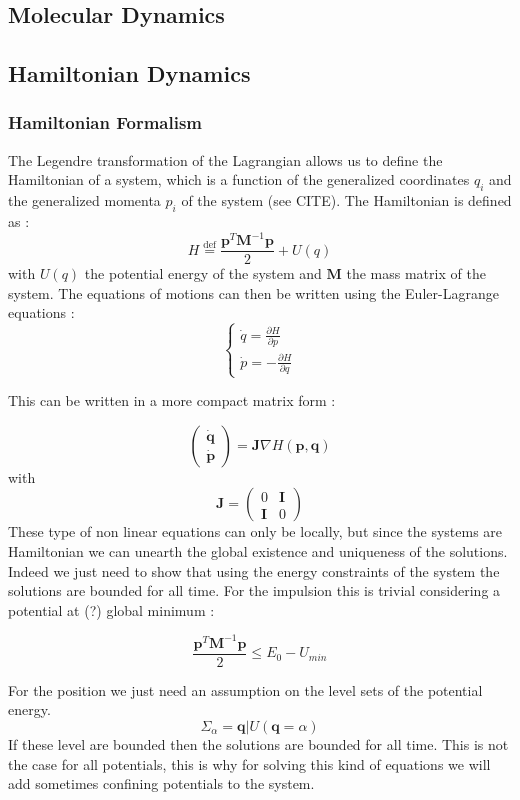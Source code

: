 \documentclass[ansiapaper]{report}
\newcommand*{\defeq}{\stackrel{\text{def}}{=}}
\begin{document}
\begin{multicols}{3}
  \chapter{Molecular Dynamics}
  \section{Hamiltonian Dynamics}
  \subsection{Hamiltonian Formalism}

  The Legendre transformation of the Lagrangian allows us to define the Hamiltonian of a system, which is a function of the generalized coordinates $q_i$ and the generalized momenta $p_i$ of the system (see CITE). The Hamiltonian is defined as :
  $$ H \defeq \frac{\textbf{p} ^T \textbf{M} ^{-1} \textbf{p}  }{2} + U(q)$$
  with $U(q)$ the potential energy of the system and $\textbf{M}$ the mass matrix of the system. The equations of motions can then be written using the Euler-Lagrange equations :
  $$
    \begin{cases}
      \dot{q} = \frac{\partial H}{\partial p} \\
      \dot{p} = -\frac{\partial H}{\partial q}
    \end{cases}
  $$

  This can be written in a more compact matrix form :

  $$ \begin{pmatrix}
      \dot{\textbf{q} } \\
      \dot{\textbf{p} }
    \end{pmatrix} = \textbf{J} \nabla H(\textbf{p} ,\textbf{q} )
  $$
  with $$\textbf{J} = \begin{pmatrix}
      0          & \textbf{I} \\
      \textbf{I} & 0
    \end{pmatrix} $$
  These type of non linear equations can only be locally, but since the systems are Hamiltonian we can unearth the global existence and uniqueness of the solutions. Indeed we just need to show that using the energy constraints of the system the solutions are bounded for all time. For the impulsion this is trivial considering a potential at (?) global minimum :

  $$ \frac{\textbf{p}^T \textbf{M} ^{-1} \textbf{p} }{2} \leq E_0 - U_{min}$$

  For the position we just need an assumption on the level sets of the potential energy. $$ \Sigma_{\alpha} = {\textbf{q}|U(\textbf{q} = \alpha) }$$
  If these level are bounded then the solutions are bounded for all time. This is not the case for all potentials, this is why for solving this kind of equations we will add sometimes confining potentials to the system.

\end{multicols}
\end{document}

